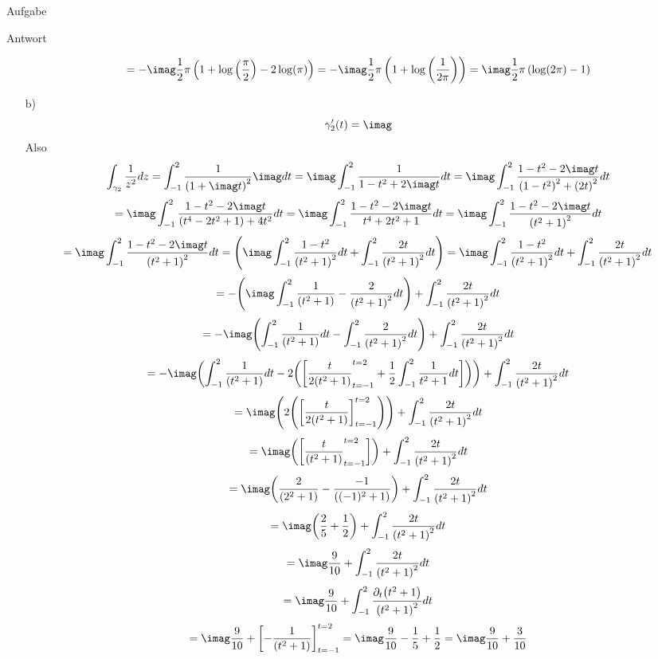 \documentclass{scrartcl}
\begin{document}
\begin{section}{Aufgabe}
\begin{subsection}{Antwort}
\begin{itemize}
\[      =-\imag \frac{1}{2} \pi \left(1+\log \left(\frac{\pi }{2}\right)-2 \log (\pi )\right)
      =-\imag \frac{1}{2} \pi  \left(1+\log \left(\frac{1}{2 \pi }\right)\right)
      =\imag \frac{1}{2} \pi \left(\log(2\pi)-1\right)
      \]
 \item[b)]
 \[\gamma_2'(t)=\imag\]
 Also \[\int_{\gamma_2}\frac{1}{z^2}dz
 =\int_{-1}^{2}\frac{1}{\left(1+\imag t\right)^2}\imag dt
 =\imag \int_{-1}^{2}\frac{1}{1-t^2+2\imag t}dt
 =\imag \int_{-1}^{2}\frac{1-t^2-2\imag t}{\qty(1-t^2)^2+\qty(2 t)^2}dt
 \]
 \[ =\imag \int_{-1}^{2}\frac{1-t^2-2\imag t}{\qty(t^4-2 t^2+1)+4t^2}dt
 =\imag \int_{-1}^{2}\frac{1-t^2-2\imag t}{t^4+2 t^2+1}dt
 =\imag \int_{-1}^{2}\frac{1-t^2-2\imag t}{\qty(t^2+1)^2}dt
 \]
 \[=\imag \int_{-1}^{2}\frac{1-t^2-2\imag t}{\qty(t^2+1)^2}dt
 =\qty( \imag\int_{-1}^{2}\frac{1-t^2}{\qty(t^2+1)^2}dt+\int_{-1}^{2}\frac{2t}{\qty(t^2+1)^2}dt)
 = \imag\int_{-1}^{2}\frac{1-t^2}{\qty(t^2+1)^2}dt+\int_{-1}^{2}\frac{2t}{\qty(t^2+1)^2}dt
 \]
 \[= -\qty(\imag\int_{-1}^{2}\frac{1}{\qty(t^2+1)}-\frac{2}{\qty(t^2+1)^2}dt)+\int_{-1}^{2}\frac{2t}{\qty(t^2+1)^2}dt
 \]
 \[= -\imag\qty(\int_{-1}^{2}\frac{1}{\qty(t^2+1)}dt-\int_{-1}^{2}\frac{2}{\qty(t^2+1)^2}dt)+\int_{-1}^{2}\frac{2t}{\qty(t^2+1)^2}dt\]
 \[= -\imag\qty(\int_{-1}^{2}\frac{1}{\qty(t^2+1)}dt
 -2\qty(\qty[\frac{t}{2\qty(t^2+1)}_{t=-1}^{t=2}+\frac{1}{2}\int_{-1}^{2}\frac{1}{t^2+1}dt]))
 +\int_{-1}^{2}\frac{2t}{\qty(t^2+1)^2}
 dt\]
  \[= \imag\qty(2\qty(\qty[\frac{t}{2\qty(t^2+1)}]_{t=-1}^{t=2}))+\int_{-1}^{2}\frac{2t}{\qty(t^2+1)^2}dt\]
  \[= \imag\qty(\qty[\frac{t}{\qty(t^2+1)}_{t=-1}^{t=2}])+\int_{-1}^{2}\frac{2t}{\qty(t^2+1)^2}dt\]
  \[= \imag\qty(\frac{2}{\qty(2^2+1)}-\frac{-1}{\qty((-1)^2+1)})+\int_{-1}^{2}\frac{2t}{\qty(t^2+1)^2}dt\]
  \[= \imag\qty(\frac{2}{5}+\frac{1}{2})+\int_{-1}^{2}\frac{2t}{\qty(t^2+1)^2}dt\]
  \[= \imag\frac{9}{10}+\int_{-1}^{2}\frac{2t}{\qty(t^2+1)^2}dt\]
  \[= \imag\frac{9}{10}+\int_{-1}^{2}\frac{\partial_t \qty(t^2+1)}{\qty(t^2+1)^2}dt\]
 \[= \imag\frac{9}{10}+\qty[-\frac{1}{\qty(t^2+1)}]_{t=-1}^{t=2}
  =\imag\frac{9}{10}-\frac{1}{5}+\frac{1}{2}
  =\imag\frac{9}{10}+\frac{3}{10}\]

\end{itemize}
\end{subsection}
\end{section}
\end{document}
